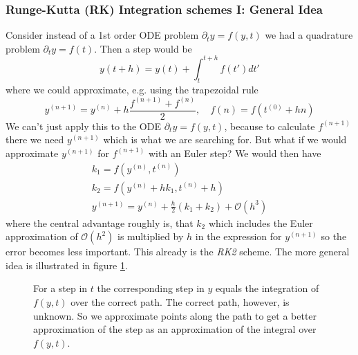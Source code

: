 \subsubsection{Runge-Kutta (RK) Integration schemes I: General Idea}
Consider instead of a 1st order ODE problem $\partial_t y = f(y,t)$ we had a quadrature
problem $\partial_t y = f(t)$. Then a step would be
\begin{equation}
  y(t+h) = y(t) + \int_{t}^{t+h} f(t') dt'
\end{equation}
where we could approximate, e.g. using the trapezoidal rule
\begin{equation}
  y^{(n+1)} = y^{(n)} + h\frac{f^{(n+1)} + f^{(n)}}{2}, \quad f{(n)} = f(t^{(0)} + hn)
\end{equation}
We can't just apply this to the ODE $\partial_t y = f(y,t)$, because to calculate $f^{(n+1)}$ there
we need $y^{(n+1)}$ which is what we are searching for. But what if we would approximate $y^{(n+1)}$ for
$f^{(n+1)}$ with an Euler step? We would then have
\begin{equation}
\begin{gathered}
  k_1=f\left(y^{(n)}, t^{(n)}\right) \\
  k_2=f\left(y^{(n)}+h k_1, t^{(n)}+h\right) \\
  y^{(n + 1)}=y^{(n)}+\frac{h}{2}\left(k_1+k_2\right)+\mathcal{O}\left(h^3\right)
\end{gathered}
\end{equation}
where the central advantage roughly is, that $k_2$ which includes the Euler approximation of $\mathcal{O}(h^2)$
is multiplied by $h$ in the expression for $y^{(n + 1)}$ so the error becomes less important. 
This already is the \textit{RK2} scheme. The more general idea is illustrated in figure \ref{fig:sol_in_heatmap}.

\begin{figure}[!htb]
  \centering
  \hfill
  \caption{For a step in $t$ the corresponding step in $y$ equals the integration of $f(y,t)$ over the correct path. The correct path, however, is unknown. So we approximate points along the path to get a better approximation of the step as an approximation of the integral over $f(y,t)$.}
  \label{fig:sol_in_heatmap}
\end{figure}

